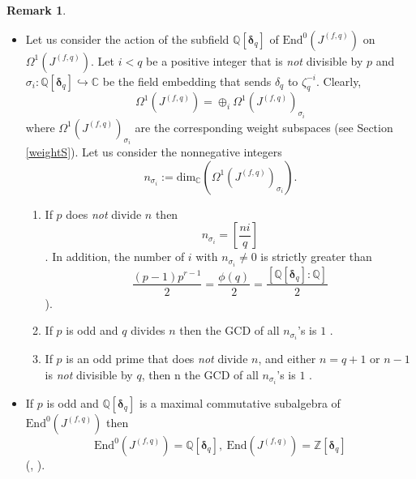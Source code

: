 \documentclass[12pt,a4paper,reqno]{amsart}
\def\Q{{\mathbb Q}}
\def\Z{{\mathbb Z}}
\def\C{{\mathbb C}}
\def\End{\mathrm{End}}
\def\dim{\mathrm{dim}}
\def\delt{{\boldsymbol \delta}}
\theoremstyle{definition}
\newtheorem{rem}[thm]{Remark}
\begin{document}
\begin{rem}
\begin{itemize}
\begin{itemize}
\end{itemize}
\item[(vii)]
Let us consider the action of the  subfield $\Q[\delt_q]$ of  $\End^0(J^{(f,q)})$  on $\Omega^1(J^{(f,q)})$. 
Let $i<q$ be a positive integer that is {\sl not} divisible by $p$  and
$\sigma_i:  \Q[\delt_q] \hookrightarrow \C$ be the field embedding that sends $\delta_q$ to $\zeta_q^{-i}$. Clearly,
$$\Omega^1(J^{(f,q)})=\oplus_i \Omega^1(J^{(f,q)})_{\sigma_i}$$
where $\Omega^1(J^{(f,q)})_{\sigma_i}$ are the corresponding weight subspaces (see Section \ref{weightS}).
Let us consider the nonnegative integers
$$n_{\sigma_i}:=\dim_{\C} (\Omega^1(J^{(f,q)})_{\sigma_i}).$$
\begin{enumerate}
\item[(1)]
If $p$ does {\sl not} divide $n$ then 
$$n_{\sigma_i}=\left[\frac{ni}{q}\right]$$
\cite[Remark 4.13]{ZarhinM}. In addition, the number of $i$ with $n_{\sigma_i}\ne 0$ is strictly greater than
$$\frac{(p-1)p^{r-1}}{2}=\frac{\phi(q)}{2}=\frac{[\Q[\delt_q]:\Q]}{2}$$ 
\cite[p. 357-358]{ZarhinM}).
\item[(2)]
If $p$ is odd and $q$ divides $n$
then the  GCD of all $n_{\sigma_i}$'s is $1$
\cite[Lemma 8.1(D]{ZarhinGanita}.
\item[(3)]
If $p$ is an odd prime that does {\sl not} divide $n$, and either $n=q+1$ or $n-1$ is {\sl not} divisible by $q$, then n the  GCD of all $n_{\sigma_i}$'s is $1$
\cite[Lemma 8.1(D]{ZarhinGanita}.
\end{enumerate}
\item[(viii)] If  $p$ is odd and  $\Q[\delt_q]$ is a maximal commutative subalgebra of $\End^0(J^{(f,q)})$ then
 $$\End^0(J^{(f,q)})=\Q[\delt_q], \ \End(J^{(f,q)})=\Z[\delt_q]$$
(\cite[Th. 4.16]{ZarhinM}, \cite[Th. 8.3]{ZarhinGanita}).
\end{itemize}
\end{rem}
\end{document}
